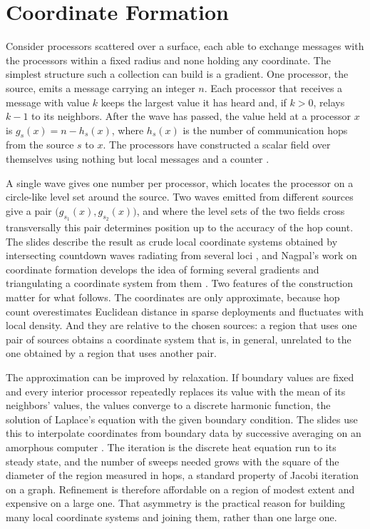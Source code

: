 \documentclass[11pt]{article}
\theoremstyle{definition}
\theoremstyle{plain}
\theoremstyle{remark}
\begin{document}
\section{Coordinate Formation}\label{sec:coords}

Consider processors scattered over a surface, each able to exchange messages with the processors within a fixed radius and none holding any coordinate. The simplest structure such a collection can build is a gradient. One processor, the source, emits a message carrying an integer $n$. Each processor that receives a message with value $k$ keeps the largest value it has heard and, if $k>0$, relays $k-1$ to its neighbors. After the wave has passed, the value held at a processor $x$ is $g_s(x)=n-h_s(x)$, where $h_s(x)$ is the number of communication hops from the source $s$ to $x$. The processors have constructed a scalar field over themselves using nothing but local messages and a counter \cite{darpa1998}.

A single wave gives one number per processor, which locates the processor on a circle-like level set around the source. Two waves emitted from different sources give a pair $\bigl(g_{s_1}(x),g_{s_2}(x)\bigr)$, and where the level sets of the two fields cross transversally this pair determines position up to the accuracy of the hop count. The slides describe the result as crude local coordinate systems obtained by intersecting countdown waves radiating from several loci \cite{darpa1998}, and Nagpal's work on coordinate formation develops the idea of forming several gradients and triangulating a coordinate system from them \cite{nagpal1999}. Two features of the construction matter for what follows. The coordinates are only approximate, because hop count overestimates Euclidean distance in sparse deployments and fluctuates with local density. And they are relative to the chosen sources: a region that uses one pair of sources obtains a coordinate system that is, in general, unrelated to the one obtained by a region that uses another pair.

The approximation can be improved by relaxation. If boundary values are fixed and every interior processor repeatedly replaces its value with the mean of its neighbors' values, the values converge to a discrete harmonic function, the solution of Laplace's equation with the given boundary condition. The slides use this to interpolate coordinates from boundary data by successive averaging on an amorphous computer \cite{darpa1998}. The iteration is the discrete heat equation run to its steady state, and the number of sweeps needed grows with the square of the diameter of the region measured in hops, a standard property of Jacobi iteration on a graph. Refinement is therefore affordable on a region of modest extent and expensive on a large one. That asymmetry is the practical reason for building many local coordinate systems and joining them, rather than one large one.
\end{document}
